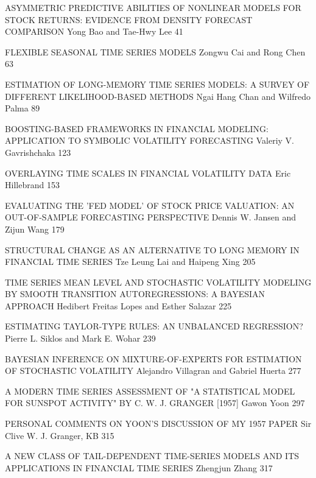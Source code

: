 ASYMMETRIC PREDICTIVE ABILITIES OF NONLINEAR MODELS FOR STOCK RETURNS: EVIDENCE FROM DENSITY FORECAST COMPARISON
Yong Bao and Tae-Hwy Lee 41



FLEXIBLE SEASONAL TIME SERIES MODELS
Zongwu Cai and Rong Chen 63



ESTIMATION OF LONG-MEMORY TIME SERIES MODELS: A SURVEY OF DIFFERENT LIKELIHOOD-BASED METHODS
Ngai Hang Chan and Wilfredo Palma 89



BOOSTING-BASED FRAMEWORKS IN FINANCIAL MODELING: APPLICATION TO SYMBOLIC VOLATILITY FORECASTING
Valeriy V. Gavrishchaka 123



OVERLAYING TIME SCALES IN FINANCIAL VOLATILITY DATA
Eric Hillebrand 153



EVALUATING THE 'FED MODEL' OF STOCK PRICE VALUATION: AN OUT-OF-SAMPLE FORECASTING PERSPECTIVE
Dennis W. Jansen and Zijun Wang 179



STRUCTURAL CHANGE AS AN ALTERNATIVE TO LONG MEMORY IN FINANCIAL TIME SERIES
Tze Leung Lai and Haipeng Xing 205



TIME SERIES MEAN LEVEL AND STOCHASTIC VOLATILITY MODELING BY SMOOTH TRANSITION AUTOREGRESSIONS: A BAYESIAN APPROACH
Hedibert Freitas Lopes and Esther Salazar 225



ESTIMATING TAYLOR-TYPE RULES: AN UNBALANCED REGRESSION?
Pierre L. Siklos and Mark E. Wohar 239




BAYESIAN INFERENCE ON MIXTURE-OF-EXPERTS FOR ESTIMATION OF STOCHASTIC VOLATILITY
Alejandro Villagran and Gabriel Huerta 277



A MODERN TIME SERIES ASSESSMENT OF "A STATISTICAL MODEL FOR SUNSPOT ACTIVITY" BY C. W. J. GRANGER [1957]
Gawon Yoon 297



PERSONAL COMMENTS ON YOON'S DISCUSSION OF MY 1957 PAPER
Sir Clive W. J. Granger, KB 315



A NEW CLASS OF TAIL-DEPENDENT TIME-SERIES MODELS AND ITS APPLICATIONS IN FINANCIAL TIME SERIES
Zhengjun Zhang 317

